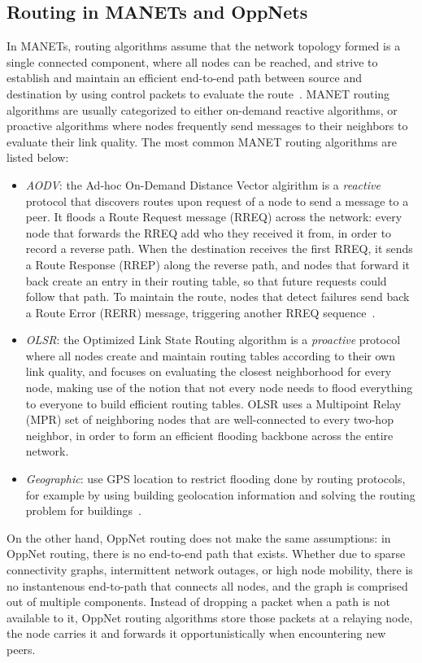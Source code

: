 \subsection{Routing in MANETs and OppNets}
\label{sec:opp-routing}
In MANETs, routing algorithms assume that the network topology formed is a single connected component, where all nodes can be reached, and strive to establish and maintain an efficient end-to-end path between source and destination by using control packets to evaluate the route~\cite{Ott2010,Almeida2012}.
MANET routing algorithms are usually categorized to either on-demand reactive algorithms, or proactive algorithms where nodes frequently send messages to their neighbors to evaluate their link quality.
The most common MANET routing algorithms are listed below:\begin{itemize}
\item \emph{AODV}: the Ad-hoc On-Demand Distance Vector algirithm is a \emph{reactive} protocol that discovers routes upon request of a node to send a message to a peer. It floods a Route Request message (RREQ) across the network: every node that forwards the RREQ add who they received it from, in order to record a reverse path. When the destination receives the first RREQ, it sends a Route Response (RREP) along the reverse path, and nodes that forward it back create an entry in their routing table, so that future requests could follow that path. To maintain the route, nodes that detect failures send back a Route Error (RERR) message, triggering another RREQ sequence~\cite{CMB-MANET}.
\item \emph{OLSR}: the Optimized Link State Routing algorithm is a \emph{proactive} protocol where all nodes create and maintain routing tables according to their own link quality, and focuses on evaluating the closest neighborhood for every node, making use of the notion that not every node needs to flood everything to everyone to build efficient routing tables. OLSR uses a Multipoint Relay (MPR) set of neighboring nodes that are well-connected to every two-hop neighbor, in order to form an efficient flooding backbone across the entire network.
\item \emph{Geographic}: use GPS location to restrict flooding done by routing protocols, for example by using building geolocation information and solving the routing problem for buildings~\cite{Liu2026}.
\end{itemize}
On the other hand, OppNet routing does not make the same assumptions: in OppNet routing, there is no end-to-end path that exists. Whether due to sparse connectivity graphs, intermittent network outages, or high node mobility, there is no instantenous end-to-path that connects all nodes, and the graph is comprised out of multiple components. Instead of dropping a packet when a path is not available to it, OppNet routing algorithms store those packets at a relaying node, the node carries it and forwards it opportunistically when encountering new peers.
